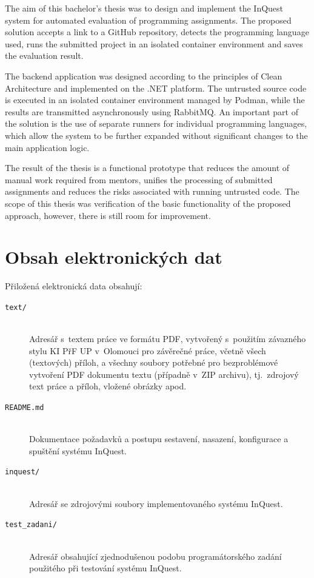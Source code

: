 \documentclass[
  biblatex,
  figures,
  tables,
  glossaries,
  index
]{kidiplom}
\begin{document}
\begin{kiconclusions}[english]
The aim of this bachelor's thesis was to design and implement the InQuest system for automated evaluation of programming assignments. The proposed solution accepts a link to a GitHub repository, detects the programming language used, runs the submitted project in an isolated container environment and saves the evaluation result.

The backend application was designed according to the principles of Clean Architecture and implemented on the .NET platform. The untrusted source code is executed in an isolated container environment managed by Podman, while the results are transmitted asynchronously using RabbitMQ. An important part of the solution is the use of separate runners for individual programming languages, which allow the system to be further expanded without significant changes to the main application logic.

The result of the thesis is a functional prototype that reduces the amount of manual work required from mentors, unifies the processing of submitted assignments and reduces the risks associated with running untrusted code. The scope of this thesis was verification of the basic functionality of the proposed approach, however, there is still room for improvement.
\end{kiconclusions}


\appendix

\section{Obsah elektronických dat} 
\label{sec:ObsahData}

Přiložená elektronická data obsahují:

\begin{description}

\item[\texttt{text/}] \hfill \\
  Adresář s~textem práce ve formátu PDF, vytvořený s~použitím
  závazného stylu KI PřF UP v~Olomouci pro závěrečné práce, včetně
  všech (textových) příloh, a všechny soubory potřebné pro
  bezproblémové vytvoření PDF dokumentu textu (případně v~ZIP
  archivu), tj.~zdrojový text práce a příloh, vložené obrázky apod.


\item[\texttt{README.md}] \hfill \\
  Dokumentace požadavků a postupu sestavení, nasazení, konfigurace a 
  spuštění systému InQuest.


\item[\texttt{inquest/}] \hfill \\
  Adresář se zdrojovými soubory implementovaného systému InQuest. 


\item[\texttt{test\_zadani/}] \hfill \\
  Adresář obsahující zjednodušenou podobu programátorského zadání 
  použitého při testování systému InQuest.

\end{description}
\end{document}

